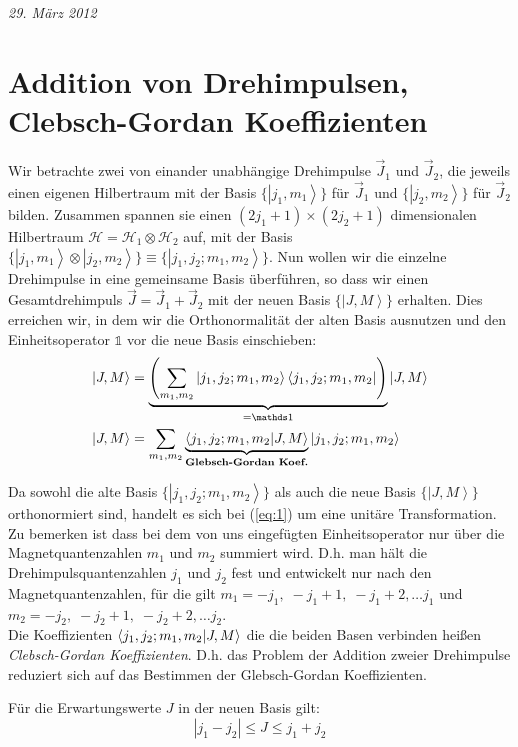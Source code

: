 \documentclass[12pt,a4paper,titlepage,oneside]{article}
\newcommand\bra[1]{\left\langle #1 \right|}
\newcommand\ket[1]{\left| #1 \right\rangle}
\newcommand\braket[2]{%
  \left\langle \vphantom{#2} #1%
    \middle|%
    \vphantom{#1} #2\right\rangle}%
\begin{document}
\textit{29. März 2012}

\section{Addition von Drehimpulsen, Clebsch-Gordan Koeffizienten}
\label{sec:addit-von-dreh}

Wir betrachte zwei von einander unabhängige Drehimpulse \(\vec J_1\) und \(\vec
J_2\), die jeweils einen eigenen Hilbertraum mit der Basis \(\{\ket{j_1,m_1}\}\)
für \(\vec J_1\) und \(\{\ket{j_2,m_2}\}\) für \(\vec J_2\) bilden. Zusammen
spannen sie einen \((2j_1+1) \times (2j_2+1)\) dimensionalen Hilbertraum
\(\mathcal H = \mathcal H_1 \otimes \mathcal H_2\) auf, mit der Basis
\(\{\ket{j_1,m_1} \otimes \ket{j_2,m_2}\} \equiv \{\ket{j_1,j_2;m_1,m_2}\}\).
Nun wollen wir die einzelne Drehimpulse in eine gemeinsame Basis überführen, so
dass wir einen Gesamtdrehimpuls \(\vec J=\vec J_1+\vec J_2\) mit der neuen Basis
\(\{\ket{J,M}\}\) erhalten. Dies erreichen wir, in dem wir die Orthonormalität
der alten Basis ausnutzen und den Einheitsoperator \(\mathds 1\) vor die neue
Basis einschieben:
\begin{align}
  \label{eq:1}
  \ket{J,M}&=\underbrace{\left(
      \sum_{m_1,m_2}\ket{j_1,j_2;m_1,m_2}\bra{j_1,j_2;m_1,m_2}
    \right)}_{= \mathds 1}
  \ket{J,M}\notag\\
   \ket{J,M}&= \sum_{m_1,m_2} 
   \underbrace{\braket{j_1,j_2;m_1,m_2}{J,M}}_
   {\text{\textbf{Glebsch-Gordan Koef.}}}
   \ket{j_1,j_2;m_1,m_2}
\end{align}

Da sowohl die alte Basis \( \{\ket{j_1,j_2;m_1,m_2}\}\) als auch die neue Basis
\(\{\ket{J,M}\}\) orthonormiert sind, handelt es sich bei (\ref{eq:1}) um eine
unitäre Transformation. Zu bemerken ist dass bei dem von uns eingefügten
Einheitsoperator nur über die Magnetquantenzahlen \(m_1\) und \(m_2\) summiert
wird. D.h. man hält die Drehimpulsquantenzahlen \(j_1\) und \(j_2\) fest und
entwickelt nur nach den Magnetquantenzahlen, für die gilt \(m_1 = -j_1,\; -j_1+1,
\;-j_1+2, \dots j_1\) und \(m_2 = -j_2, \;-j_2+1,\;-j_2+2, \dots j_2\).\\
Die Koeffizienten \( \braket{j_1,j_2;m_1,m_2}{J,M} \) die die beiden Basen verbinden
heißen \emph{Clebsch-Gordan Koeffizienten}. D.h. das Problem der Addition zweier
Drehimpulse reduziert sich auf das Bestimmen der Glebsch-Gordan Koeffizienten.

Für die Erwartungswerte \(J\) in der neuen Basis gilt:
\begin{equation}
  \label{eq:8}
  \boxed{|j_1-j_2|\leq J\leq j_1+j_2}
\end{equation}
\end{document}
